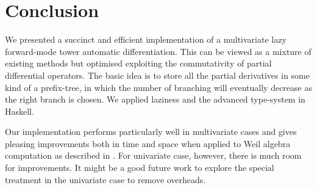 \documentclass[rims-smooth-paper.tex]{subfiles}
\begin{document}
\section{Conclusion}
\label{sec:concl}
We presented a succinct and efficient implementation of a multivariate lazy forward-mode tower automatic differentiation.
This can be viewed as a mixture of existing methods but optimised exploiting the commutativity of partial differential operators.
The basic idea is to store all the partial derivatives in some kind of a prefix-tree, in which the number of branching will eventually decrease as the right branch is chosen.
We applied laziness and the advanced type-system in Haskell.

Our implementation performs particularly well in multivariate cases and gives pleasing improvements both in time and space when applied to Weil algebra computation as described in \cite{Ishii:2021vw}.
For univariate case, however, there is much room for improvements.
It might be a good future work to explore the special treatment in the univariate case to remove overheads.
\end{document}
